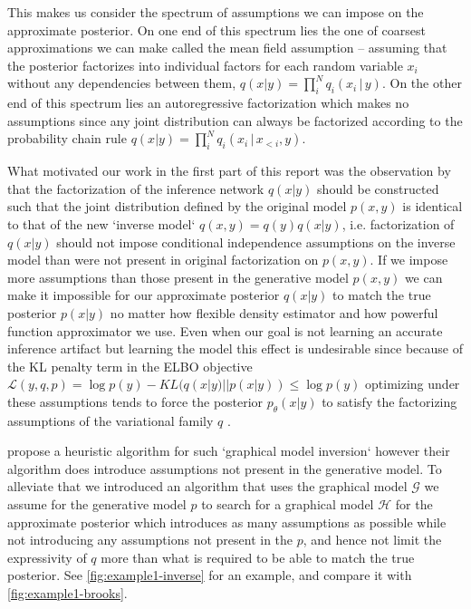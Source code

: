 \documentclass[12pt]{article}
\begin{document}
This makes us consider the spectrum of assumptions we can impose on the approximate posterior.
On one end of this spectrum lies the one of coarsest approximations we can make called the mean field assumption -- assuming that the posterior factorizes into individual factors for each random variable $x_i$ without any dependencies between them, $q(x|y)=\prod^N_iq_i(x_i\,|\,y)$.
On the other end of this spectrum lies an autoregressive factorization which makes no assumptions since any joint distribution can always be factorized according to the probability chain rule $q(x|y)=\prod^N_iq_i(x_i\,|\,x_{<i},y)$.

What motivated our work in the first part of this report was the observation by \citet{StuhlmullerEtAl2013} that
the factorization of the inference network $q(x|y)$ should be constructed such that the joint distribution defined by the original model $p(x, y)$ is identical to that of the new `inverse model` $q(x, y) = q(y)q(x|y)$, i.e. factorization of $q(x|y)$ should not impose conditional independence assumptions on the inverse model than were not present in original factorization on $p(x,y)$.
If we impose more assumptions than those present in the generative model $p(x,y)$ we can make it impossible for our approximate posterior $q(x|y)$ to match the true posterior $p(x|y)$ no matter how flexible density estimator and how powerful function approximator we use.
Even when our goal is not learning an accurate inference artifact but learning the model this effect is undesirable
since because of the KL penalty term in the ELBO objective
$\mathcal{L}(y,q,p)=\log p(y)-KL(q(x|y) || p(x|y)) \le \log p(y)$ \citep{VAE}
optimizing under these assumptions tends to force the posterior $p_\theta(x|y)$ to satisfy the factorizing assumptions of the variational family $q$ \citep{FIVO}.

\citet{StuhlmullerEtAl2013} propose a heuristic algorithm for such `graphical model inversion` however their algorithm does introduce assumptions not present in the generative model.
To alleviate that we introduced an algorithm that uses the graphical model $\mathcal{G}$ we assume for the generative model $p$ to search for a graphical model $\mathcal{H}$ for the approximate posterior which introduces as many assumptions as possible while not introducing any assumptions not present in the $p$, and hence not limit the expressivity of $q$ more than what is required to be able to match the true posterior. 
See \autoref{fig:example1-inverse} for an example, and compare it with \autoref{fig:example1-brooks}.
\end{document}
